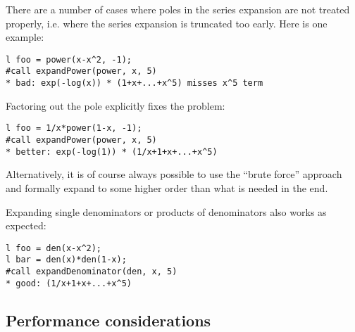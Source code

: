 \documentclass[titlepage]{article}
\begin{document}
There are a number of cases where poles in the series expansion are not
treated properly, i.e. where the series expansion is truncated too
early. Here is one example:
\begin{verbatim}
l foo = power(x-x^2, -1);
#call expandPower(power, x, 5)
* bad: exp(-log(x)) * (1+x+...+x^5) misses x^5 term
\end{verbatim}
Factoring out the pole explicitly fixes the problem:
\begin{verbatim}
l foo = 1/x*power(1-x, -1);
#call expandPower(power, x, 5)
* better: exp(-log(1)) * (1/x+1+x+...+x^5)
\end{verbatim}
Alternatively, it is of course always possible to use the ``brute
force'' approach and formally expand to some higher order than what is
needed in the end.

Expanding single denominators or products of denominators also works as
expected:
\begin{verbatim}
l foo = den(x-x^2);
l bar = den(x)*den(1-x);
#call expandDenominator(den, x, 5)
* good: (1/x+1+x+...+x^5)
\end{verbatim}

\subsection{Performance considerations}
\label{sec:perf}
\end{document}
